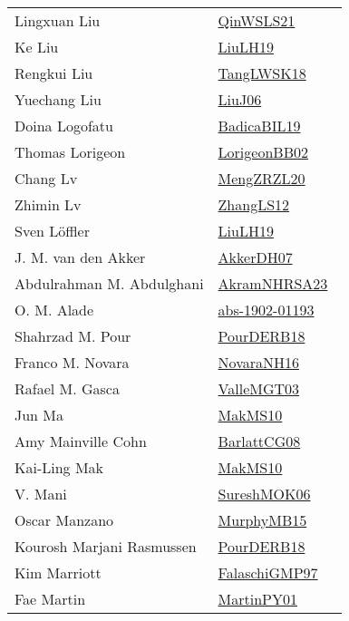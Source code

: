 {\begin{longtable}{p{4cm}p{20cm}}
Lingxuan Liu & \href{works/QinWSLS21.pdf}{QinWSLS21}~\cite{QinWSLS21}\\
Ke Liu & \href{works/LiuLH19.pdf}{LiuLH19}~\cite{LiuLH19}\\
Rengkui Liu & \href{works/TangLWSK18.pdf}{TangLWSK18}~\cite{TangLWSK18}\\
Yuechang Liu & \href{works/LiuJ06.pdf}{LiuJ06}~\cite{LiuJ06}\\
Doina Logofatu & \href{works/BadicaBIL19.pdf}{BadicaBIL19}~\cite{BadicaBIL19}\\
Thomas Lorigeon & \href{works/LorigeonBB02.pdf}{LorigeonBB02}~\cite{LorigeonBB02}\\
Chang Lv & \href{works/MengZRZL20.pdf}{MengZRZL20}~\cite{MengZRZL20}\\
Zhimin Lv & \href{works/ZhangLS12.pdf}{ZhangLS12}~\cite{ZhangLS12}\\
Sven L{\"{o}}ffler & \href{works/LiuLH19.pdf}{LiuLH19}~\cite{LiuLH19}\\
J. M. van den Akker & \href{works/AkkerDH07.pdf}{AkkerDH07}~\cite{AkkerDH07}\\
Abdulrahman M. Abdulghani & \href{works/AkramNHRSA23.pdf}{AkramNHRSA23}~\cite{AkramNHRSA23}\\
O. M. Alade & \href{works/abs-1902-01193.pdf}{abs-1902-01193}~\cite{abs-1902-01193}\\
Shahrzad M. Pour & \href{works/PourDERB18.pdf}{PourDERB18}~\cite{PourDERB18}\\
Franco M. Novara & \href{works/NovaraNH16.pdf}{NovaraNH16}~\cite{NovaraNH16}\\
Rafael M. Gasca & \href{works/ValleMGT03.pdf}{ValleMGT03}~\cite{ValleMGT03}\\
Jun Ma & \href{works/MakMS10.pdf}{MakMS10}~\cite{MakMS10}\\
Amy Mainville Cohn & \href{works/BarlattCG08.pdf}{BarlattCG08}~\cite{BarlattCG08}\\
Kai{-}Ling Mak & \href{works/MakMS10.pdf}{MakMS10}~\cite{MakMS10}\\
V. Mani & \href{works/SureshMOK06.pdf}{SureshMOK06}~\cite{SureshMOK06}\\
Oscar Manzano & \href{works/MurphyMB15.pdf}{MurphyMB15}~\cite{MurphyMB15}\\
Kourosh Marjani Rasmussen & \href{works/PourDERB18.pdf}{PourDERB18}~\cite{PourDERB18}\\
Kim Marriott & \href{works/FalaschiGMP97.pdf}{FalaschiGMP97}~\cite{FalaschiGMP97}\\
Fae Martin & \href{works/MartinPY01.pdf}{MartinPY01}~\cite{MartinPY01}\\

\end{longtable}}
